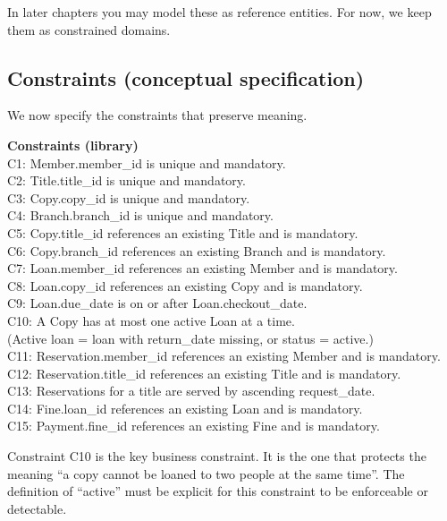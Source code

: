 In later chapters you may model these as reference entities.
For now, we keep them as constrained domains.

\subsection{Constraints (conceptual specification)}
We now specify the constraints that preserve meaning.

\begin{examplebox}
\textbf{Constraints (library)}\\
C1: Member.member\_id is unique and mandatory.\\
C2: Title.title\_id is unique and mandatory.\\
C3: Copy.copy\_id is unique and mandatory.\\
C4: Branch.branch\_id is unique and mandatory.\\
C5: Copy.title\_id references an existing Title and is mandatory.\\
C6: Copy.branch\_id references an existing Branch and is mandatory.\\
C7: Loan.member\_id references an existing Member and is mandatory.\\
C8: Loan.copy\_id references an existing Copy and is mandatory.\\
C9: Loan.due\_date is on or after Loan.checkout\_date.\\
C10: A Copy has at most one active Loan at a time.\\
\hspace*{1.6em}(Active loan = loan with return\_date missing, or status = active.)\\
C11: Reservation.member\_id references an existing Member and is mandatory.\\
C12: Reservation.title\_id references an existing Title and is mandatory.\\
C13: Reservations for a title are served by ascending request\_date.\\
C14: Fine.loan\_id references an existing Loan and is mandatory.\\
C15: Payment.fine\_id references an existing Fine and is mandatory.
\end{examplebox}

Constraint C10 is the key business constraint.
It is the one that protects the meaning “a copy cannot be loaned to two people at the same time”.
The definition of “active” must be explicit for this constraint to be enforceable or detectable.


